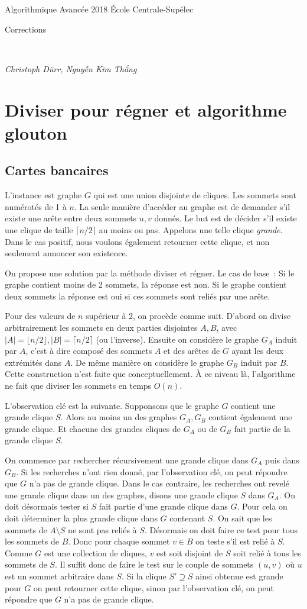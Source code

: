 \documentclass[12pt]{article}
\newcommand{\MakeScribeTop}[1]{
\noindent
\begin{framed}
\noindent
 Algorithmique Avancée 2018
 \hfill
 École Centrale-Supélec
 \\[1em]
 \centerline{ \Large
#1
 }
 \\[1em]
\centerline{  \it Christoph Dürr, Nguyễn Kim Thắng}
\end{framed}
}
\begin{document}
    \MakeScribeTop{Corrections}

    \section{Diviser pour régner et algorithme glouton}

    \subsection{Cartes bancaires}

    L'instance est graphe $G$ qui est une union disjointe de cliques. Les sommets sont numérotés de 1 à $n$. La seule manière d'accéder au graphe est de demander s'il existe une arête entre deux sommets $u,v$ donnés.  Le but est de décider s'il existe une clique de taille $\lceil n/2 \rceil$ au moins ou pas. Appelons une telle clique \emph{grande}.  Dans le cas positif, nous voulons également retourner cette clique, et non seulement annoncer son existence.

    On propose une solution par la méthode diviser et régner.
    Le cas de base~:
    Si le graphe contient moins de 2 sommets, la réponse est non. Si le graphe contient deux sommets la réponse est oui si ces sommets sont reliés par une arête.

    Pour des valeurs de $n$ supérieur à 2, on procède comme suit. D'abord on divise arbitrairement les sommets en deux parties disjointes $A,B$, avec $|A|=\lfloor n/2 \rfloor, |B|=\lceil n/2 \rceil$ (ou l'inverse).  Ensuite on considère le graphe $G_A$ induit par $A$, c'est à dire composé des sommets $A$ et des arêtes de $G$ ayant les deux extrémités dans $A$.  De même manière on considère le graphe $G_B$ induit par $B$.  Cette construction n'est faite que conceptuellement. À ce niveau là, l'algorithme ne fait que diviser les sommets en temps $O(n)$.

    L'observation clé est la suivante. Supponsons que le graphe $G$ contient une grande clique $S$. Alors au moins un des graphes $G_A, G_B$ contient également une grande clique.  Et chacune des grandes cliques de $G_A$ ou de $G_B$ fait partie de la grande clique $S$.

    On commence par rechercher récursivement une grande clique dans $G_A$ puis dans $G_B$.  Si les recherches n'ont rien donné, par l'observation clé, on peut répondre que $G$ n'a pas de grande clique.  Dans le cas contraire, les recherches ont revelé une grande clique dans un des graphes, disons une grande clique $S$ dans $G_A$.  On doit désormais tester si $S$ fait partie d'une grande clique dans $G$.  Pour cela on doit déterminer la plus grande clique dans $G$ contenant $S$.  On sait que les sommets de $A\setminus S$ ne sont pas reliés à $S$. Désormais on doit faire ce test pour tous les sommets de $B$.  Donc pour chaque sommet $v\in B$ on teste s'il est relié à $S$.  Comme $G$ est une collection de cliques, $v$ est soit disjoint de $S$ soit relié à tous les sommets de $S$. Il suffit donc de faire le test sur le couple de sommets $(u,v)$ où 
     $u$ est un sommet arbitraire dans $S$. 
     Si la clique $S'\supseteq S$ ainsi obtenue est grande pour $G$ on peut retourner cette clique, sinon par l'observation clé, on peut répondre que $G$ n'a pas de grande clique.
\end{document}
